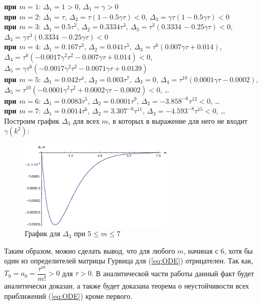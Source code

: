 \textbf{при $m=1$}: $\Delta_1 = 1 > 0$, $\Delta_1 = \gamma > 0$\\

\textbf{при $m=2$}: $\Delta_1 = \tau$, $\Delta_2 = \tau (1 - 0.5 \gamma \tau) < 0$, $\Delta_3 = \gamma \tau (1 - 0.5 \gamma \tau) < 0$\\

\textbf{при $m=3$}: $\Delta_1 = 0.5 \tau ^2$, $\Delta_2 = 0.3334 \tau ^3$, $\Delta_3 = \tau ^3 (0.3334\, -0.25 \gamma  \tau ) < 0$, $\Delta_4 = \gamma  \tau ^3 (0.3334\, -0.25 \gamma  \tau ) < 0$\\

\textbf{при $m=4$}: $\Delta_1 = 0.167 \tau ^3$, $\Delta_2 = 0.041 \tau ^5$, $\Delta_3 = \tau ^6 (0.007 \gamma  \tau + 0.014)$, \\$\Delta_4 = \tau ^6 \left(-0.0017 \gamma ^2 \tau ^2-0.007 \gamma  \tau +0.014\right) < 0$,\\$\Delta_5 = \gamma  \tau ^6 \left(-0.0017 \gamma ^2 \tau ^2-0.0071 \gamma  \tau +0.0139 \right)$\\

\textbf{при $m=5$}: $\Delta_1 = 0.042 \tau ^4$, $\Delta_2 = 0.003 \tau ^7$, $\Delta_3 = 0$, $\Delta_4 = \tau ^{10} (0.0001 \gamma  \tau -0.0002)$, $\Delta_5 = \tau ^{10} \left(-0.0001 \gamma ^2 \tau ^2+0.0002 \gamma  \tau -0.0002\right) < 0$, \dots\\

\textbf{при $m=6$}: $\Delta_1 = 0.0083 \tau ^5$, $\Delta_2 = 0.0001 \tau ^9$, $\Delta_3 = -3.858^{-6} \tau ^{12} < 0$, \dots\\

\textbf{при $m=7$}: $\Delta_1 = 0.0014 \tau ^6$, $\Delta_2 = 3.307^{-6} \tau ^{11}$, $\Delta_3 = -4.593^{-8} \tau ^{15} < 0$, \dots\\

Построим график $\Delta_3$ для всех $m$, в которых в выражение для него не входит $\gamma(k^2)$:

\begin{figure}[h]
\begin{center}
\includegraphics[width=0.65\textwidth]{./1_modelling/coefCheck.eps}
\end{center}
\caption{График для $\Delta_3$ при $5 \leq m \leq 7$}
\end{figure}

Таким образом, можно сделать вывод, что для любого $m$, начиная с $6$, хотя бы один из определителей матрицы Гурвица для (\ref{eq:ODE}) отрицателен. Так как, $T_0 = a_0 = \dfrac{\tau^{m}}{m!} >0$ для $\tau>0$. В аналитической части работы данный факт будет аналитически доказан, а также будет доказана теорема о неустойчивости всех приближений (\ref{eq:ODE}) кроме первого.